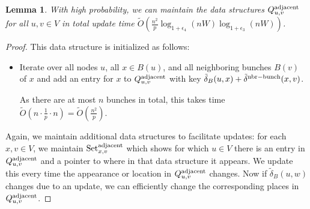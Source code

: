 \documentclass[11pt]{article}
\newtheorem{lemma}[theorem]{Lemma}
\theoremstyle{definition}
\theoremstyle{remark}
\begin{document}
\begin{lemma}\label{lm:adjacentDS}
    With high probability, we can maintain the data structures $Q^{\rm{adjacent}}_{u,v}$ for all $u,v\in V$ in total update time $ \tilde O (\tfrac{n^2}{p}\log_{1+\epsilon_4}(nW)\log_{1+\epsilon_3}(nW)) $.
\end{lemma}
\begin{proof}

    This data structure is initialized as follows:    
    \begin{itemize}
        \item Iterate over all nodes $ u $, all $ x \in B (u) $, and all neighboring bunches $ B (v) $ of $ x $ and add an entry for $x$ to $Q^{\rm{adjacent}}_{u,v}$ with key $\tilde\delta_B(u,x)+\tilde\delta^{\rm{nbr-bunch}}(x,v)$.
    
    As there are at most $ n $ bunches in total, this takes time $ \tilde O (n \cdot \tfrac{1}{p} \cdot n) = \tilde O (\tfrac{n^2}{ p}) $. 
    \end{itemize}
    Again, we maintain additional data structures to facilitate updates: for each $x,v\in V$, we maintain $\text{Set}_{x,v}^{\rm{adjacent}}$ which shows for which $u\in V$ there is an entry in $Q^{\rm{adjacent}}_{u,v}$ and a pointer to where in that data structure it appears. We update this every time the appearance or location in $Q^{\rm{adjacent}}_{u,v}$ changes. Now if $\tilde\delta_B(u,w)$ changes due to an update, we can efficiently change the corresponding places in $Q^{\rm{adjacent}}_{u,v}$. 
    

\end{proof}
\end{document}
